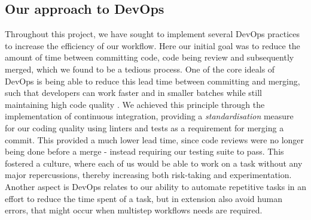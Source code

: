 

\subsection{Our approach to DevOps} %
Throughout this project, we have sought to implement several DevOps practices to increase the efficiency of our workflow. Here our initial goal was to reduce the amount of time between committing code, code being review and subsequently merged, which we found to be a tedious process. One of the core ideals of DevOps is being able to reduce this lead time between committing and merging, such that developers can work faster and in smaller batches while still maintaining high code quality \parencite{handbook}. We achieved this principle through the implementation of continuous integration, providing a \textit{standardisation} measure for our coding quality using linters and tests as a requirement for merging a commit. This provided a much lower lead time, since code reviews were no longer being done before a merge - instead requiring our testing suite to pass. This fostered a culture, where each of us would be able to work on a task without any major repercussions, thereby increasing both risk-taking and experimentation. Another aspect is DevOps relates to our ability to automate repetitive tasks in an effort to reduce the time spent of a task, but in extension also avoid human errors, that might occur when multistep workflows needs are required.  